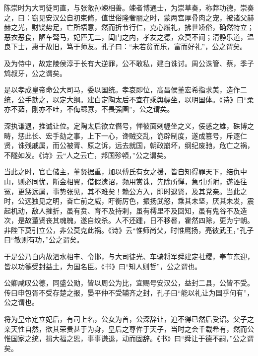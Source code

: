 \documentclass[12pt,UTF8]{ctexbook}
\begin{document}
陈崇时为大司徒司直，与张敞孙竦相善。竦者博通士，为崇草奏，称莽功德，崇奏之，曰：窃见安汉公自初束脩，值世俗隆奢丽之时，蒙两宫厚骨肉之宠，被诸父赫赫之光，财饶势足，亡所牾意，然而折节行仁，克心履礼，拂世矫俗，确然特立；恶衣恶食，陋车驽马，妃匹无二，闺门之内，孝友之德，众莫不闻；清静乐道，温良下士，惠于故旧，笃于师友。孔子曰：“未若贫而乐，富而好礼”，公之谓矣。



及为侍中，故定陵侯淳于长有大逆罪，公不敢私，建白诛讨。周公诛管、蔡，季子鸩叔牙，公之谓矣。



是以孝成皇帝命公大司马，委以国统。孝哀即位，高昌侯董宏希指求美，造作二统，公手劾之，以定大纲。建白定陶太后不宜在乘舆幄坐，以明国体。《诗》曰“柔亦不茹，刚亦不吐，不侮鳏寡，不畏强圉”，公之谓矣。



深执谦退，推诚让位。定陶太后欲立僭号，惮彼面剌幄坐之义，佞惑之雄，硃博之畴，惩此长、宏手劾之事，上下一心，谗贼交乱，诡辟制度，遂成篡号，斥逐仁贤，诛残戚属，而公被胥、原之诉，远去就国，朝政崩坏，纲纪废驰，危亡之祸，不隧如发。《诗》云“人之云亡，邦国殄顇，”公之谓矣。



当此之时，官亡储主，董贤据重，加以傅氏有女之援，皆自知得罪天下，结仇中山，则必同忧，断金相翼，借假遗诏，频用赏诛，先除所惮，急引所附，遂诬往冤，更惩远属，事势张见，其不难矣！赖公方入，即时退贤，及其党亲。当此之时，公远独见之明，奋亡前之威，盱衡厉色，振扬武怒，乘其未坚，厌其未发，震起机动，敌人摧折，虽有贲、育不及持剌，虽有樗里不及回知，虽有鬼谷不及造次，是故董贤丧其魂魄，遂自绞杀。人不还踵，日不移晷，霍然四除，更为宁朝。非陛下莫引立公，非公莫克此祸。《诗》云“惟师尚父，时惟鹰扬，亮彼武王，”孔子曰“敏则有功，”公之谓矣。



于是公乃白内故泗水相丰、令邯，与大司徒光、车骑将军舜建定社稷，奉节东迎，皆以功德受封益土，为国名臣。《书》曰“知人则哲”，公之谓也。



公卿咸叹公德，同盛公勋，皆以周公为比，宜赐号安汉公，益封二县，公皆不受。传曰申包胥不受存楚之报，晏平仲不受辅齐之封，孔子曰“能以礼让为国乎何有”，公之谓也。



将为皇帝定立妃后，有司上名，公女为首，公深辞让，迫不得已然后受诏。父子之亲天性自然，欲其荣贵甚于为身，皇后之尊侔于天子，当时之会千载希有，然而公惟国家之统，揖大福之恩，事事谦退，动而固辞。《书》曰“舜让于德不嗣，”公之谓矣。
\end{document}
